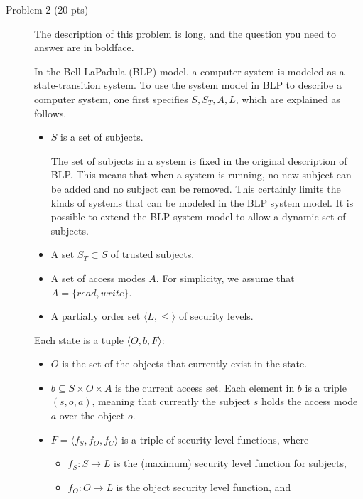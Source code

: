 \documentclass[11pt]{article}
\newcommand{\tuple}[1]{\ensuremath{\langle #1 \rangle}\xspace}
\newcommand{\rea}{read}
\newcommand{\wri}{write}
\begin{document}
\begin{description}
 \item[Problem 2 (20 pts)]
The description of this problem is long, and the question you need to answer are in
boldface.

In the Bell-LaPadula (BLP) model, a computer system is modeled as a state-transition
system.  To use the system model in BLP to describe a computer system, one first
specifies $S,S_T,A,L$, which are explained as follows.

\begin{itemize}
 \item
$S$ is a set of subjects.

The set of subjects in a system is fixed in the original description of BLP.  This
means that when a system is running, no new subject can be added and no subject can
be removed. This certainly limits the kinds of systems that can be modeled in the BLP
system model. It is possible to extend the BLP system model to allow a dynamic set of
subjects.

 \item
A set $S_T \subset S$ of trusted subjects.

 \item
A set of access modes $A$.  For simplicity, we assume that $A= \{\rea, \wri \}$.

 \item
A partially order set $\tuple{L, \leq}$ of security levels.

\end{itemize}



Each state is a tuple $\tuple{O,b,F}$:

\begin{itemize}
 \item
$O$ is the set of the objects that currently exist in the state.

 \item
$b \subseteq S \times O \times A$ is the current access set.  Each element in $b$ is
a triple $(s, o, a)$, meaning that currently the subject $s$ holds the access mode
$a$ over the object $o$.

 \item
$F=\tuple{f_S,f_O,f_C}$ is a triple of security level functions, where
\begin{itemize}
 \item
$f_S:S\longrightarrow L$ is the (maximum) security level function for subjects,

 \item
$f_O: O \longrightarrow L$ is the object security level function, and


\end{itemize}
\end{itemize}
\end{description}
\end{document}
